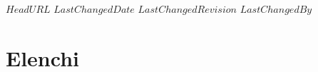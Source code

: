 \svnidlong
{$HeadURL$}
{$LastChangedDate$}
{$LastChangedRevision$}
{$LastChangedBy$}

\chapter{Elenchi}
\begin{multicols}{2}
	\listofdefines
\end{multicols}
\begin{multicols}{2}
	\listoftheoremas
\end{multicols}
\begin{comment}

\chapter{Elenchi ...}
\labelChapter{elenchi}

\begin{introduction}
‘‘BEEP BOOP INSERIRE CITAZIONE QUA BEEP BOOP.''
\begin{flushright}
	\textsc{NON UN ROBOT,} UN UMANO IN CARNE ED OSSA BEEP BOOP.
\end{flushright}
\end{introduction}
\end{comment}